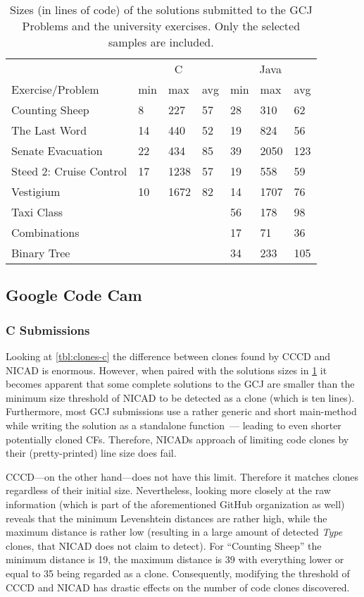 \documentclass[10pt,journal,compsoc]{IEEEtran}
\def\T#1{\textsl{Type\nobreakdash-#1}}
\begin{document}
\begin{table}
  \centering\begin{tabular}{l lll lll}
    \toprule
                            & \multicolumn{3}{c}{C} & \multicolumn{3}{c}{Java} \\
    \cmidrule(r){2-4}\cmidrule{5-7}
    Exercise/Problem        & min & max & avg & min & max & avg\\
    \midrule
    Counting Sheep          &  8 & 227 & 57 & 28 & 310 & 62\\
    The Last Word           &  14 &440 & 52 &  19 & 824 & 56 \\
    Senate Evacuation       &  22 & 434 & 85 & 39 & 2050 & 123\\
    Steed 2: Cruise Control & 17& 1238 & 57  & 19& 558 & 59\\
    Vestigium               &  10&  1672 & 82&  14& 1707  & 76 \\
    \midrule
    Taxi Class & & & & 56 & 178 & 98 \\
    Combinations & & & & 17 & 71 & 36 \\
    Binary Tree & & & & 34 & 233 & 105 \\
    \bottomrule
  \end{tabular}\medskip
  \caption{Sizes (in lines of code) of the solutions submitted to the GCJ Problems and the university exercises. Only the selected samples are included.}
  \label{tbl:file-sizes}
\end{table}


\subsection{Google Code Cam}
\subsubsection{C Submissions}
Looking at \cref{tbl:clones-c} the difference between clones found by CCCD and NICAD is enormous.
However, when paired with the solutions sizes in \cref{tbl:file-sizes} it becomes apparent that some complete solutions to the GCJ are smaller than the minimum size threshold of NICAD to be detected as a clone (which is ten lines).
Furthermore, most GCJ submissions use a rather generic and short main-method while writing the solution as a standalone function~--- leading to even shorter potentially cloned CFs.
Therefore, NICADs approach of limiting code clones by their (pretty-printed) line size does fail.

CCCD---on the other hand---does not have this limit. Therefore it matches clones regardless of their initial size.
Nevertheless, looking more closely at the raw information (which is part of the aforementioned GitHub organization as well) reveals that the minimum Levenshtein distances are rather high, while the maximum distance is rather low (resulting in a large amount of detected \T4 clones, that NICAD does not claim to detect).
For \enquote{Counting Sheep} the minimum distance is \num{19}, the maximum distance is \num{39} with everything lower or equal to \num{35} being regarded as a clone.
Consequently, modifying the threshold of CCCD and NICAD has drastic effects on the number of code clones discovered.
\end{document}
